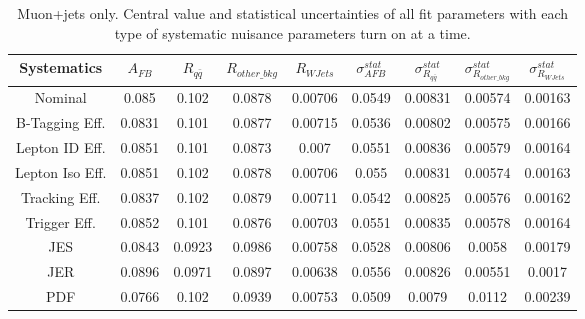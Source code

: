 \documentclass{cmspaperpdf}
\begin{document}
\begin{table}[htb]
\centering
\label{tab:mu-sys-full}
\begin{tabular}{ccccccccc}
Systematics &      $A_{FB}$ &   $R_{q\bar{q}}$ & $R_{other\_bkg}$ &  $R_{WJets}$ & $\sigma_{AFB}^{stat}$ & $\sigma_{R_{q\bar{q}}}^{stat}$ & $\sigma_{R_{other\_bkg}}^{stat}$ & $\sigma_{R_{WJets}}^{stat}$ \\
\hline
Nominal         &   0.085 &   0.102 &      0.0878 &  0.00706 &       0.0549 &       0.00831 &              0.00574 &          0.00163 \\
\hline
B-Tagging Eff.  &  0.0831 &   0.101 &      0.0877 &  0.00715 &       0.0536 &       0.00802 &              0.00575 &          0.00166 \\
Lepton ID Eff.  &  0.0851 &   0.101 &      0.0873 &    0.007 &       0.0551 &       0.00836 &              0.00579 &          0.00164 \\
Lepton Iso Eff. &  0.0851 &   0.102 &      0.0878 &  0.00706 &        0.055 &       0.00831 &              0.00574 &          0.00163 \\
Tracking Eff.   &  0.0837 &   0.102 &      0.0879 &  0.00711 &       0.0542 &       0.00825 &              0.00576 &          0.00162 \\
Trigger Eff.    &  0.0852 &   0.101 &      0.0876 &  0.00703 &       0.0551 &       0.00835 &              0.00578 &          0.00164 \\
\hline
JES             &  0.0843 &  0.0923 &      0.0986 &  0.00758 &       0.0528 &       0.00806 &               0.0058 &          0.00179 \\
JER             &  0.0896 &  0.0971 &      0.0897 &  0.00638 &       0.0556 &       0.00826 &              0.00551 &           0.0017 \\
PDF             &  0.0766 &   0.102 &      0.0939 &  0.00753 &       0.0509 &        0.0079 &               0.0112 &          0.00239 \\
\hline
\end{tabular}
\caption{Muon+jets only. Central value and statistical uncertainties of all fit parameters with each type of systematic nuisance parameters turn on at a time.}
\end{table}
\end{document}
